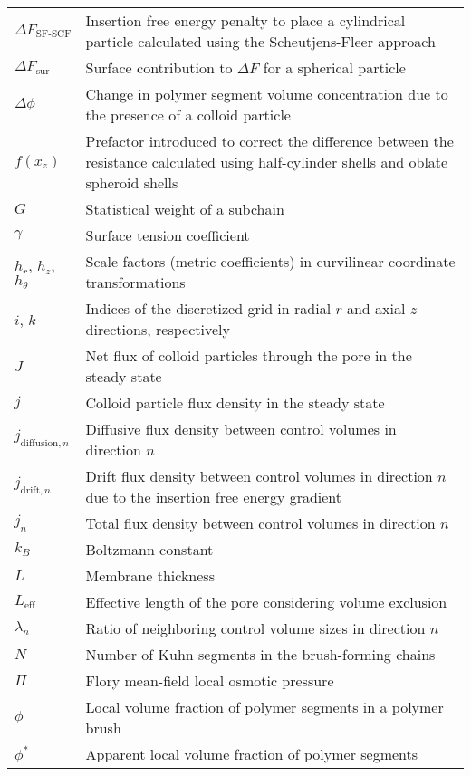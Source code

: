 \documentclass[10pt, a4paper]{article}
\begin{document}
\begin{tabularx}{\linewidth}{l X}
    $\Delta F_{\textrm{SF-SCF}}$ & Insertion free energy penalty to place a cylindrical particle calculated using the Scheutjens-Fleer approach \\
    $\Delta F_{\textrm{sur}}$ & Surface contribution to $\Delta F$ for a spherical particle\\
    $\Delta \phi$ & Change in polymer segment volume concentration due to the presence of a colloid particle \\
    $f(x_z)$ & Prefactor introduced to correct the difference between the resistance calculated using half-cylinder shells and oblate spheroid shells \\
    $G$ & Statistical weight of a subchain \\
    $\gamma$ & Surface tension coefficient \\
    $h_{r}$, $h_{z}$, $h_{\theta}$ & Scale factors (metric coefficients) in curvilinear coordinate transformations \\
    $i$, $k$ & Indices of the discretized grid in radial $r$ and axial $z$ directions, respectively \\
    $J$ & Net flux of colloid particles through the pore in the steady state \\
    $j$ & Colloid particle flux density in the steady state \\
    $j_{\textrm{diffusion}, n}$ & Diffusive flux density between control volumes in direction $n$ \\
    $j_{\textrm{drift}, n}$ & Drift flux density between control volumes in direction $n$ due to the insertion free energy gradient \\
    $j_{n}$ & Total flux density between control volumes in direction $n$ \\
    $k_B$ & Boltzmann constant \\
    $L$ & Membrane thickness \\
    $L_{\textrm{eff}}$ & Effective length of the pore considering volume exclusion \\
    $\lambda_{n}$ & Ratio of neighboring control volume sizes in direction $n$ \\
    $N$ & Number of Kuhn segments in the brush-forming chains \\
    $\Pi$ & Flory mean-field local osmotic pressure \\
    $\phi$ & Local volume fraction of polymer segments in a polymer brush \\
    $\phi^{\ast}$ & Apparent local volume fraction of polymer segments \\

\end{tabularx}
\end{document}
